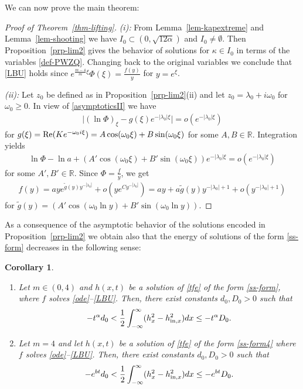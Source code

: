 \documentclass{article}%
\renewcommand{\Re}{{\rm Re}}
\newtheorem{corollary}[theorem]{Corollary} %
\newcommand{\alp}{\alpha}
\newcommand{\lam}{\lambda}
\newcommand{\R}{\mathbb{R}}
\begin{document}
We can now prove the main theorem:
\begin{proof}[Proof of Theorem~\ref{thm-lifting}] 

{\it (i):} From Lemma~\ref{lem-kapextreme} and Lemma~\ref{lem-shooting} we have
  $I_0 \subset (0,\sqrt{12\alp})$ and $I_0\neq \emptyset$. Then Proposition~\ref{prp-lim2} 
gives the behavior of solutions for $\kappa\in I_0$ in terms of the variables 
\eqref{def-PWZQ}. Changing back to the original variables we conclude that 
\eqref{LBU} holds since $e^{\frac{m-4}{m}\xi} \Phi(\xi) = \frac {f(y)}y$ for $y = e^\xi$.

  \medskip
  
{\it (ii):} Let $z_0$ be defined as in Proposition~\ref{prp-lim2}(ii) 
and let $z_0 = \lam_0 + i \omega_0$ for $\omega_0 \geq 0$. 
In view of \eqref{asymptoticsII} we have
\begin{align}
  \Big|(\ln \Phi)_\xi - g(\xi) e^{-|\lam_0| \xi}\Big| = o(e^{-|\lam_0| \xi})
\end{align}
for $g(\xi) = \Re(K e^{-\omega_0i \xi}) = A \cos (\omega_0 \xi) + B\sin(\omega_0 \xi)$
 for some $A,B \in \R$. Integration yields
\begin{align}
    \ln \Phi - \ln a + (A' \cos (\omega_0 \xi) + B' \sin (\omega_0 \xi))  e^{-|\lam_0| \xi} =  o( e^{-|\lam_0| \xi})%
\end{align}
for some $A',B' \in \R$. Since $\Phi = \frac fy$, we get
\begin{align}
 f(y) =  a y e^{\tilde g(y) y^{-|\lam_0|}} + o( y e^{C y^{-|\lam_0|}})  = 
a y + a \tilde g(y) y^{-|\lam_0|+1} + o( y^{-|\lam_0|+1})
\end{align}
for $\tilde g(y) = (A' \cos (\omega_0 \ln y)  + B' \sin (\omega_0\ln y))$.
\end{proof}
As a consequence of the asymptotic behavior of the solutions encoded in 
Proposition~\ref{prp-lim2} we obtain also that the energy of solutions of 
the form \eqref{ss-form} decreases in the following sense:
\begin{corollary}\label{corol-diss}
  \begin{enumerate}
  \item Let $m \in (0,4)$ and $h(x,t)$ be a solution of \eqref{tfe} 
of the form \eqref{ss-form}, where $f$ solves \eqref{ode}--\eqref{LBU}. 
Then, there exist constants $d_0, D_0 > 0$ such that
  \begin{equation}\label{ss-diss}
    -t^\alp d_0 < \frac 12 \int_{-\infty}^\infty (h_x^2 - h_{{\rm in},x}^2)dx\leq 
    -t^\alp D_0.
  \end{equation}
\item Let $m = 4$ and let $h(x,t)$ be a solution of \eqref{tfe} of the form 
\eqref{ss-form4} where $f$ solves \eqref{ode}--\eqref{LBU}. 
Then, there exist constants $d_0, D_0 > 0$ such that
\begin{equation}\label{ss-diss4}
 -e^{b t} d_0 < \frac{1}{2}\int_{-\infty}^\infty (h_x^2 - h_{{\rm in},x}^2)dx\leq -e^{b t} D_0.
  \end{equation}
  \end{enumerate}
\end{corollary}
\end{document}
